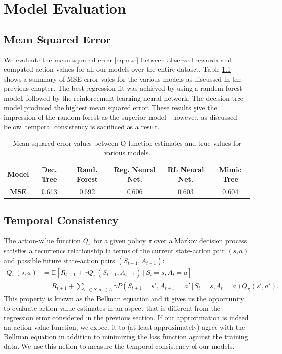 \documentclass{sfuthesis}
\begin{document}
	\chapter{Model Evaluation}
	
	\section{Mean Squared Error}
	We evaluate the mean squared error \eqref{eq:mse} between observed rewards and computed action values for all our models over the entire dataset. Table \ref{tab:mse-models} shows a summary of MSE error vales for the various models as discussed in the previous chapter. The best regression fit was achieved by using a random forest model, followed by the reinforcement learning neural network. The decision tree model produced the highest mean squared error. These results give the impression of the random forest as the superior model - however, as discussed below, temporal consistency is sacrificed as a result.\\
	\begin{table}[ht]
		\centering
		\begin{tabular}{c|ccccc}
			\textbf{Model} & Dec. Tree & Rand. Forest & Reg. Neural Net. & RL Neural Net. & Mimic Tree \\ \hline
			\textbf{MSE}   & 0.613     & 0.592        & 0.606           & 0.603          & 0.604     
		\end{tabular}
		\caption{Mean squared error values between Q function estimates and true values for various models.}
		\label{tab:mse-models}
	\end{table}
	
	\section{Temporal Consistency}
	
	The action-value function $Q_\pi$ for a given policy $\pi$ over a Markov decision process satisfies a recurrence relationship in terms of the current state-action pair $(s,a)$ and possible future state-action pairs $(S_{t+1},A_{t+1})$: 
	\begin{align}
		Q_\pi(s,a) &= \mathbb{E} \left[  R_{t+1} + \gamma Q_{\pi}(S_{t+1}, A_{t+1}) \, | \, S_t = s, A_t = a \right]\\
		&=  R_{t+1} + \sum_{s' \in S, a' \in A} \gamma P(S_{t+1} = s', A_{t+1} = a' \, | \, S_t = s, A_t = a) Q_\pi(s',a').
	\end{align}
	This property is known as the Bellman equation \cite{sutton2018reinforcement} and it gives us the opportunity to evaluate action-value estimates in an aspect that is different from the regression error considered in the previous section. If our approximation is indeed an action-value function, we expect it to (at least approximately) agree with the Bellman equation in addition to minimizing the loss function against the training data. We use this notion to measure the temporal consistency of our models.
	
\end{document}

